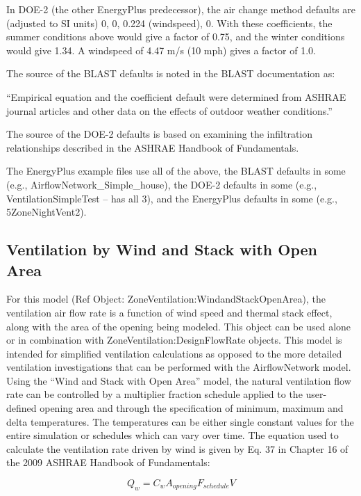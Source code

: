 In DOE-2 (the other EnergyPlus predecessor), the air change method defaults are (adjusted to SI units) 0, 0, 0.224 (windspeed), 0. With these coefficients, the summer conditions above would give a factor of 0.75, and the winter conditions would give 1.34. A windspeed of 4.47 m/s (10 mph) gives a factor of 1.0.

The source of the BLAST defaults is noted in the BLAST documentation as:

``Empirical equation and the coefficient default were determined from ASHRAE journal articles and other data on the effects of outdoor weather conditions.''

The source of the DOE-2 defaults is based on examining the infiltration relationships described in the ASHRAE Handbook of Fundamentals.

The EnergyPlus example files use all of the above, the BLAST defaults in some (e.g., AirflowNetwork\_Simple\_house), the DOE-2 defaults in some (e.g., VentilationSimpleTest -- has all 3), and the EnergyPlus defaults in some (e.g., 5ZoneNightVent2).

\subsection{Ventilation by Wind and Stack with Open Area}\label{ventilation-by-wind-and-stack-with-open-area}

For this model (Ref Object: ZoneVentilation:WindandStackOpenArea), the ventilation air flow rate is a function of wind speed and thermal stack effect, along with the area of the opening being modeled. This object can be used alone or in combination with ZoneVentilation:DesignFlowRate objects. This model is intended for simplified ventilation calculations as opposed to the more detailed ventilation investigations that can be performed with the AirflowNetwork model. Using the ``Wind and Stack with Open Area'' model, the natural ventilation flow rate can be controlled by a multiplier fraction schedule applied to the user-defined opening area and through the specification of minimum, maximum and delta temperatures. The temperatures can be either single constant values for the entire simulation or schedules which can vary over time. The equation used to calculate the ventilation rate driven by wind is given by Eq. 37 in Chapter 16 of the 2009 ASHRAE Handbook of Fundamentals:

\begin{equation}
{Q_w} = {C_w}{A_{opening}}{F_{schedule}}V
\end{equation}

